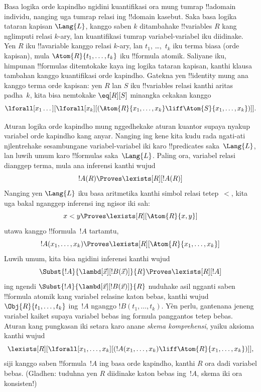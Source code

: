 \documentclass[../../../include/open-logic-section]{subfiles}
\begin{document}


Basa logika orde kapindho ngidini kuantifikasi
ora mung tumrap !!a{domain} individu, nanging
uga tumrap relasi ing !!{domain} kasebut.
Saka basa logika tataran kapisan $\Lang{L}$, kanggo
saben $k$ ditambahake !!{variable}s $R$ kang
nglimputi relasi $k$-ary, lan kuantifikasi
tumrap variabel-variabel iku diidinake.
Yen $R$ iku !!a{variable} kanggo relasi
$k$-ary, lan $t_1$, \dots,~$t_k$ iku
terma biasa (orde kapisan), mula
$\Atom{R}{t_1,\dots,t_k}$ iku !!{formula}
atomik. Saliyane iku, himpunan !!{formula}s
ditemtokake kaya ing logika tataran kapisan,
kanthi klausa tambahan kanggo kuantifikasi
orde kapindho. Gatekna yen !!{identity}
mung ana kanggo terma orde kapisan: yen
$R$ lan $S$ iku !!{variable}s relasi
kanthi aritas padha~$k$, kita bisa
nemtokake $\eq[R][S]$ minangka cekakan
kanggo
\[
\lforall[x_1 \dots][\lforall[x_k][(\Atom{R}{x_1, \dots, x_k} \liff
  \Atom{S}{x_1, \dots, x_k})]].
\]

Aturan logika orde kapindho mung nggedhekake
aturan kuantor supaya nyakup variabel
orde kapindho kang anyar. Nanging ing kene
kita kudu rada ngati-ati njlentrehake
sesambungane variabel-variabel iki karo
!!{predicate}s saka~$\Lang{L}$, lan
luwih umum karo !!{formula}s saka~$\Lang{L}$.
Paling ora, variabel relasi dianggep terma,
mula ana inferensi kanthi wujud
\[
!A(R) \Proves \lexists[R][!A(R)]
\]
Nanging yen $\Lang{L}$ iku basa aritmetika
kanthi simbol relasi tetep~$<$, kita uga
bakal nganggep inferensi ing ngisor iki sah:
\[
x < y \Proves \lexists[R][\Atom{R}{x,y}]
\]
utawa kanggo !!{formula}~$!A$ tartamtu,
\[
!A(x_1, \dots, x_k) \Proves \lexists[R][\Atom{R}{x_1,\dots,x_k}]
\]
Luwih umum, kita bisa ngidini inferensi
kanthi wujud
\[
\Subst{!A}{\lambd[\vec x][!B(\vec x)]}{R} \Proves
\lexists[R][!A]
\]
ing ngendi $\Subst{!A}{\lambd[\vec x][!B(\vec x)]}{R}$
nuduhake asil ngganti saben !!{formula}
atomik kang variabel relasine katon bebas, kanthi wujud
$\Obj{R}{t_1,\dots,t_k}$ ing~$!A$
nganggo $!B(t_1, \dots, t_k)$. Yèn perlu, gantenana jeneng variabel kaiket supaya variabel bebas ing formula panggantos tetep bebas.
Aturan kang pungkasan iki setara karo
anane {\em skema komprehensi}, yaiku
aksioma kanthi wujud
\[
\lexists[R][\lforall[x_1, \dots, x_k][(!A(x_1, \dots, x_k) \liff
\Atom{R}{x_1, \dots, x_k})]],
\]
siji kanggo saben !!{formula}~$!A$
ing basa orde kapindho, kanthi
$R$ ora dadi variabel bebas.
(Gladhen: tuduhna yen $R$ diidinake
katon bebas ing~$!A$, skema iki ora konsisten!)
\end{document}
